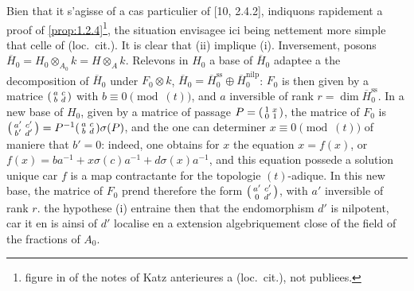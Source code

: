 \documentclass[12pt,a4paper]{article}
\theoremstyle{plain}
\theoremstyle{definition}
\theoremstyle{remark}
\begin{document}
Bien that it s'agisse of a cas particulier of [10, 2.4.2], indiquons rapidement a proof of \ref{prop:1.2.4}\footnote{figure in of the notes of Katz anterieures a (loc.\ cit.), not publiees.}, the situation envisagee ici being nettement more simple that celle of (loc.\ cit.). It is clear that (ii) implique (i). Inversement, posons $\overline{H}_0 = H_0 \otimes_{A_0} k = H \otimes_A k$. Relevons in $H_0$ a base of $\overline{H}_0$ adaptee a the decomposition of $\overline{H}_0$ under $F_0 \otimes k$, $\overline{H}_0 = \overline{H}_0^{\mathrm{ss}} \oplus \overline{H}_0^{\mathrm{nilp}}$: $F_0$ is then given by a matrice $\begin{psmallmatrix} a & c \\ b & d \end{psmallmatrix}$ with $b \equiv 0 \pmod{(t)}$, and $a$ inversible of rank $r = \dim \overline{H}_0^{\mathrm{ss}}$. In a new base of $H_0$, given by a matrice of passage $P = \begin{psmallmatrix} 1 & x \\ 0 & 1 \end{psmallmatrix}$, the matrice of $F_0$ is $\begin{psmallmatrix} a' & c' \\ b' & d' \end{psmallmatrix} = P^{-1}\begin{psmallmatrix} a & c \\ b & d \end{psmallmatrix}\sigma(P)$, and the one can determiner $x \equiv 0 \pmod{(t)}$ of maniere that $b' = 0$: indeed, one obtains for $x$ the equation $x = f(x)$, or $f(x) = ba^{-1} + x\sigma(c)a^{-1} + d\sigma(x)a^{-1}$, and this equation possede a solution unique car $f$ is a map contractante for the topologie $(t)$-adique. In this new base, the matrice of $F_0$ prend therefore the form $\begin{psmallmatrix} a' & c' \\ 0 & d' \end{psmallmatrix}$, with $a'$ inversible of rank $r$. the hypothese (i) entraine then that the endomorphism $d'$ is nilpotent, car it en is ainsi of $d'$ localise en a extension algebriquement close of the field of the fractions of $A_0$.
\end{document}
